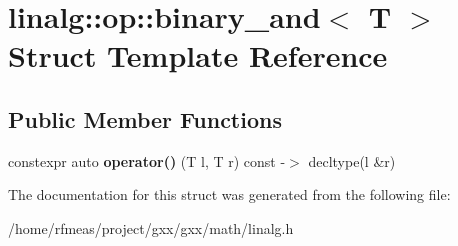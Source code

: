 \hypertarget{structlinalg_1_1op_1_1binary__and}{}\section{linalg\+:\+:op\+:\+:binary\+\_\+and$<$ T $>$ Struct Template Reference}
\label{structlinalg_1_1op_1_1binary__and}
\subsection*{Public Member Functions}
\begin{DoxyCompactItemize}
\item 
constexpr auto {\bfseries operator()} (T l, T r) const -\/$>$ decltype(l \&r)\hypertarget{structlinalg_1_1op_1_1binary__and_a60697f000860b6e5b24465575e308a72}{}\label{structlinalg_1_1op_1_1binary__and_a60697f000860b6e5b24465575e308a72}

\end{DoxyCompactItemize}


The documentation for this struct was generated from the following file\+:\begin{DoxyCompactItemize}
\item 
/home/rfmeas/project/gxx/gxx/math/linalg.\+h\end{DoxyCompactItemize}
